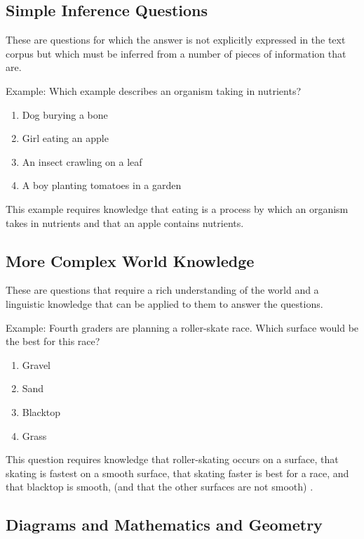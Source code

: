 \subsection{Simple Inference Questions}
These are questions for which the answer is not explicitly expressed in the text corpus but which must be inferred from a number of pieces of information that are.

Example: Which example describes an organism taking in nutrients? \cite{clark2015elementary}

\begin{enumerate}[label=\Alph*.]
\item Dog burying a bone
\item Girl eating an apple
\item An insect crawling on a leaf
\item A boy planting tomatoes in a garden
\end{enumerate}

This example requires knowledge that eating is a process by which an organism takes in nutrients and that an apple contains nutrients.

\subsection{More Complex World Knowledge}

These are questions that require a rich understanding of the world and a linguistic knowledge that can be applied to them to answer the questions.

Example: \cite{clark2015elementary}  Fourth graders are planning a roller-skate race.  Which surface would be the best for this race?  

\begin{enumerate}[label=\Alph*.]
\item Gravel
\item Sand
\item Blacktop
\item Grass
\end{enumerate}

This question requires knowledge that roller-skating occurs on a surface, that skating is fastest on a smooth surface, that skating faster is best for a race, and that blacktop is smooth, (and that the other surfaces are not smooth) \cite{clark2015elementary}.

\subsection{Diagrams and Mathematics and Geometry}

